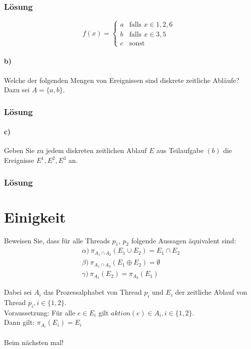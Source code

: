 \documentclass[a4paper]{scrartcl}
\begin{document}
\subsubsection*{Lösung}
\begin{equation*}
\ f(x) = 
\begin{cases}
a & \text{falls } x \in {1, 2, 6}\\
b & \text{falls } x \in {3, 5}\\
c & \text{sonst}
\end{cases}
\end{equation*}

\paragraph{b)} Welche der folgenden Mengen von Ereignissen sind diskrete zeitliche Abläufe? Dazu sei $ A = \{a, b\} $.  

\subsubsection*{Lösung}

\paragraph{c)} Geben Sie zu jedem diskreten zeitlichen Ablauf $ E $ aus Teilaufgabe $ (b) $ die Ereignisse $E^1, E^2, E^3 $ an.

\subsubsection*{Lösung}

\section{Einigkeit}
Beweisen Sie, dass für alle Threads $ p_1 $, $ p_2 $ folgende Aussagen äquivalent sind:
\begin{align*}
& \alpha) \ \pi_{A_1 \cap A_2} \left(E_1 \cup E_2\right) = E_1 \cap E_2\\
& \beta) \ \pi_{A_1 \cap A_2} \left(E_1 \oplus E_2\right) = \emptyset\\
& \gamma) \ \pi_{A_1} \left(E_2\right) = \pi_{A_2} \left(E_1\right)
\end{align*}

Dabei sei $ A_i $ das Prozessalphabet von Thread $ p_i $ und $ E_i $ der zeitliche Ablauf von Thread $ p_i, i \in \{1, 2\}$.\\
Voraussetzung: Für alle $ e \in E_i $ gilt $ aktion(e) \in A_i, i \in \{1, 2\} $.\\
Dann gilt: $ \pi_{A_i} \left(E_i\right) = E_i $\\
\\
Beim nächsten mal!
\end{document}
